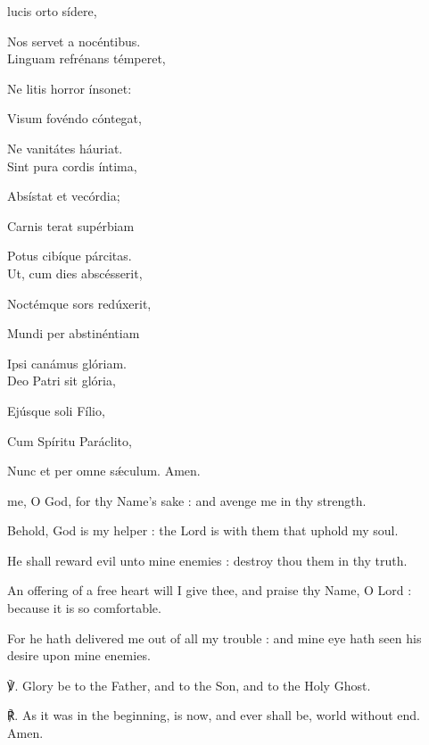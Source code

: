 { lucis orto sídere,\par
{}
Nos servet a nocéntibus.\\

Linguam refrénans témperet,\par
Ne litis horror ínsonet:\par
Visum fovéndo cóntegat,\par
Ne vanitátes háuriat.\\

Sint pura cordis íntima,\par
Absístat et vecórdia;\par
Carnis terat supérbiam\par
Potus cibíque párcitas.\\

Ut, cum dies abscésserit,\par
Noctémque sors redúxerit,\par
Mundi per abstinéntiam\par
Ipsi canámus glóriam.\\

Deo Patri sit glória,\par
Ejúsque soli Fílio,\par
Cum Spíritu Paráclito,\par
Nunc et per omne sǽculum. Amen.\\}

 me, O God, for thy Name's sake : and avenge me in thy strength.\par
{}
Behold, God is my helper : the Lord is with them that uphold my soul.\par
{}He shall reward evil unto mine enemies : destroy thou them in thy truth.\par
{}An offering of a free heart will I give thee, and praise thy Name, O Lord : because it is so comfortable.\par
{}For he hath delivered me out of all my trouble : and mine eye hath seen his desire upon mine enemies.\par
℣. Glory be to the Father, and to the Son, and to the Holy Ghost.\par
℟. As it was in the beginning, is now, and ever shall be, world without end. Amen.

